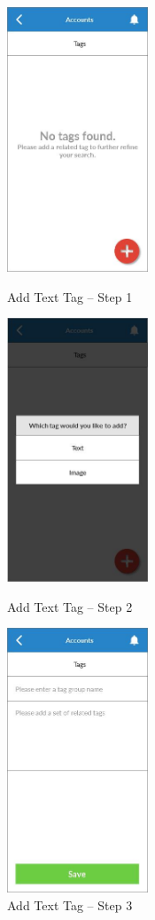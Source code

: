 \begin{figure}
  \subfigures
  \centering
  \begin{minipage}{4.6cm}
    \centering
    \includegraphics[width=4.2cm]{inc/ui_tag_step1.jpg}
    \caption{Add Text Tag -- Step 1}
    \label{fig:ui_tag_step1}
  \end{minipage}
  \begin{minipage}{4.6cm}
    \centering
    \includegraphics[width=4.2cm]{inc/ui_tag_step2.jpg}
    \caption{Add Text Tag -- Step 2}
    \label{fig:ui_tag_step2}
  \end{minipage}
  \begin{minipage}{4.6cm}
    \centering
    \includegraphics[width=4.2cm]{inc/ui_tag_step3.jpg}
    \caption{Add Text Tag -- Step 3}
    \label{fig:ui_tag_step3}
  \end{minipage}
\end{figure}

